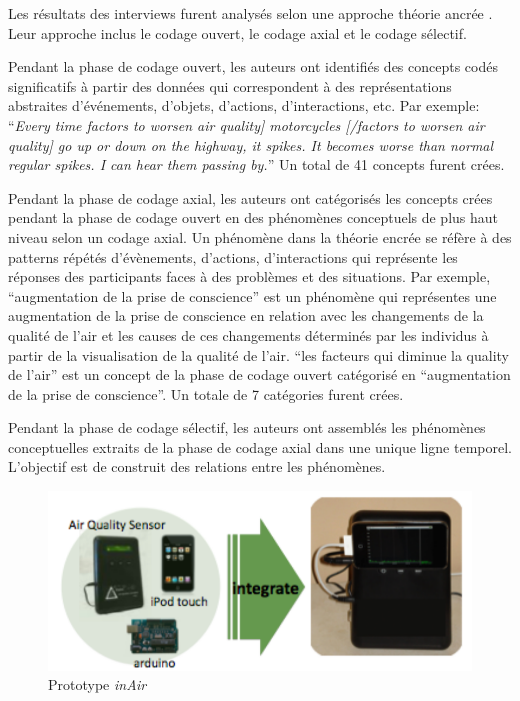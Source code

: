 \documentclass[10pt,a5paper,twoside]{article}
\begin{document}
Les résultats des interviews furent analysés selon une approche théorie
ancrée \citep{strauss1990basics}. Leur approche inclus le codage ouvert,
le codage axial et le codage sélectif.

Pendant la phase de codage ouvert, les auteurs ont identifiés des
concepts codés significatifs à partir des données qui correspondent à
des représentations abstraites d'événements, d'objets, d'actions,
d'interactions, etc. Par exemple: ``\emph{Every time factors to worsen
air quality{]} motorcycles {[}/factors to worsen air quality{]} go up or
down on the highway, it spikes. It becomes worse than normal regular
spikes. I can hear them passing by.}'' Un total de 41 concepts furent
crées.

Pendant la phase de codage axial, les auteurs ont catégorisés les
concepts crées pendant la phase de codage ouvert en des phénomènes
conceptuels de plus haut niveau selon un codage axial. Un phénomène dans
la théorie encrée se réfère à des patterns répétés d'évènements,
d'actions, d'interactions qui représente les réponses des participants
faces à des problèmes et des situations. Par exemple, ``augmentation de
la prise de conscience'' est un phénomène qui représentes une
augmentation de la prise de conscience en relation avec les changements
de la qualité de l'air et les causes de ces changements déterminés par
les individus à partir de la visualisation de la qualité de l'air. ``les
facteurs qui diminue la quality de l'air'' est un concept de la phase de
codage ouvert catégorisé en ``augmentation de la prise de conscience''.
Un totale de 7 catégories furent crées.

Pendant la phase de codage sélectif, les auteurs ont assemblés les
phénomènes conceptuelles extraits de la phase de codage axial dans une
unique ligne temporel. L'objectif est de construit des relations entre
les phénomènes.

\begin{figure}
\centering
\includegraphics[]{images/inair-screenshot3.png}
\caption{Prototype \emph{inAir}}\label{fig:inair1}
\end{figure}
\end{document}
